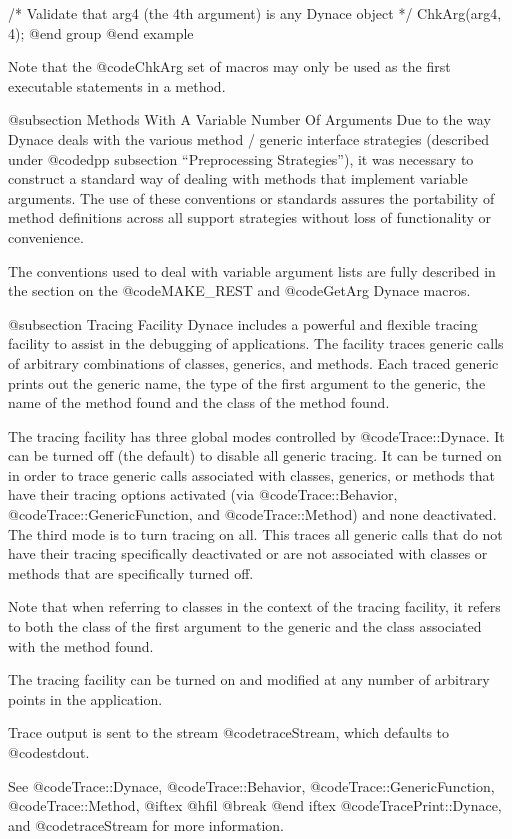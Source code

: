 /*  Validate that arg4 (the 4th argument) is any Dynace object  */
ChkArg(arg4, 4);
@end group
@end example


Note that the @code{ChkArg} set of macros may only be used as the first
executable statements in a method.

@subsection Methods With A Variable Number Of Arguments
Due to the way Dynace deals with the various method / generic interface
strategies (described under @code{dpp} subsection ``Preprocessing
Strategies''), it was necessary to construct a standard way of dealing
with methods that implement variable arguments.  The use of these
conventions or standards assures the portability of method definitions
across all support strategies without loss of functionality or
convenience.

The conventions used to deal with variable argument lists are fully
described in the section on the @code{MAKE_REST} and @code{GetArg}
Dynace macros.

@subsection Tracing Facility
Dynace includes a powerful and flexible tracing facility to assist
in the debugging of applications.  The facility traces generic calls
of arbitrary combinations of classes, generics, and methods.
Each traced generic prints out the generic name, the type of the first
argument to the generic, the name of the method found and the class
of the method found.

The tracing facility has three global modes controlled by
@code{Trace::Dynace}.  It can be turned off (the default)
to disable all generic tracing.  It can be turned on in order to
trace generic calls associated with classes, generics, or methods
that have their tracing options activated (via @code{Trace::Behavior},
@code{Trace::GenericFunction}, and @code{Trace::Method}) and none
deactivated.  The third mode is to turn tracing on all.  This traces
all generic calls that do not have their tracing specifically
deactivated or are not associated with classes or methods that
are specifically turned off.

Note that when referring to classes in the context of the tracing
facility, it refers to both the class of the first argument to
the generic and the class associated with the method found.

The tracing facility can be turned on and modified at any number of
arbitrary points in the application.

Trace output is sent to the stream @code{traceStream}, which defaults
to @code{stdout}.

See @code{Trace::Dynace}, @code{Trace::Behavior},
@code{Trace::GenericFunction}, @code{Trace::Method},
@iftex 
@hfil @break 
@end iftex
@code{TracePrint::Dynace}, and @code{traceStream} for more information.




